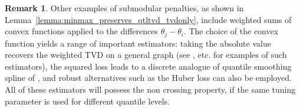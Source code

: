 \documentclass[11pt]{article}
\theoremstyle{plain}
\theoremstyle{definition}
\newtheorem{remark}{Remark}
\theoremstyle{remark}
\begin{document}
\begin{remark}
Other examples of submodular penalties, as shown in Lemma~\ref{lemma:minmax_preserves_qtltvd_tvdonly}, include weighted sums of convex functions applied to the differences $\theta_{j}-\theta_i$. The choice of the convex function yields a range of important estimators: taking the absolute value recovers the weighted TVD on a general graph (see \cite{wang2016trend, ye2021non}, etc. for examples of such estimators), the squared loss leads to a discrete analogue of quantile smoothing spline of \cite{koenker1994quantile}, and robust alternatives such as the Huber loss can also be employed. All of these estimators will possess the non crossing property, if the same tuning parameter is used for different quantile levels.  
\end{remark}
\end{document}
